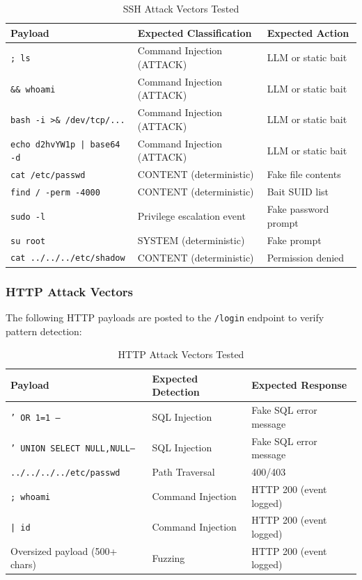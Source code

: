 \begin{table}[h!]
    \centering
    \caption{SSH Attack Vectors Tested}
    \renewcommand{\arraystretch}{1.3}
    \begin{tabular}{|l|l|l|}
        \hline
        \textbf{Payload} & \textbf{Expected Classification} & \textbf{Expected Action} \\
        \hline
        \texttt{; ls} & Command Injection (ATTACK) & LLM or static bait \\
        \texttt{\&\& whoami} & Command Injection (ATTACK) & LLM or static bait \\
        \texttt{bash -i >\& /dev/tcp/...} & Command Injection (ATTACK) & LLM or static bait \\
        \texttt{echo d2hvYW1p | base64 -d} & Command Injection (ATTACK) & LLM or static bait \\
        \texttt{cat /etc/passwd} & CONTENT (deterministic) & Fake file contents \\
        \texttt{find / -perm -4000} & CONTENT (deterministic) & Bait SUID list \\
        \texttt{sudo -l} & Privilege escalation event & Fake password prompt \\
        \texttt{su root} & SYSTEM (deterministic) & Fake prompt \\
        \texttt{cat ../../../etc/shadow} & CONTENT (deterministic) & Permission denied \\
        \hline
    \end{tabular}
\end{table}

\subsubsection{HTTP Attack Vectors}

The following \ac{HTTP} payloads are posted to the \texttt{/login} endpoint to verify pattern detection:

\begin{table}[h!]
    \centering
    \caption{HTTP Attack Vectors Tested}
    \renewcommand{\arraystretch}{1.3}
    \begin{tabular}{|l|l|l|}
        \hline
        \textbf{Payload} & \textbf{Expected Detection} & \textbf{Expected Response} \\
        \hline
        \texttt{' OR 1=1 --} & SQL Injection & Fake SQL error message \\
        \texttt{' UNION SELECT NULL,NULL--} & SQL Injection & Fake SQL error message \\
        \texttt{../../../../etc/passwd} & Path Traversal & 400/403 \\
        \texttt{; whoami} & Command Injection & HTTP 200 (event logged) \\
        \texttt{| id} & Command Injection & HTTP 200 (event logged) \\
        Oversized payload (500+ chars) & Fuzzing & HTTP 200 (event logged) \\
        \hline
    \end{tabular}
\end{table}

